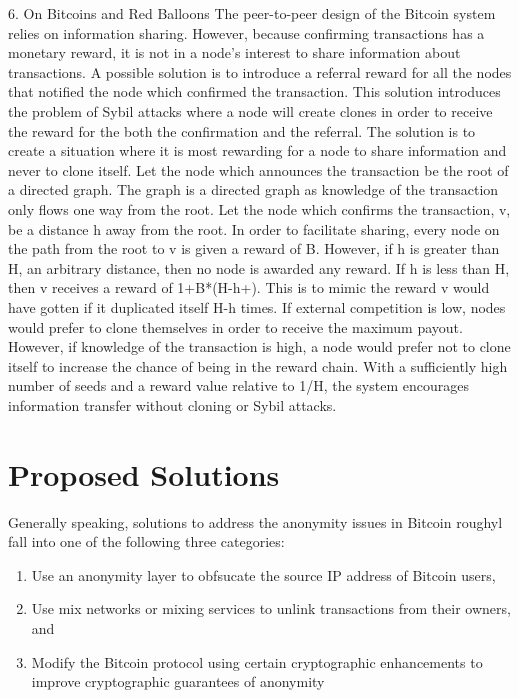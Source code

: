 6.  On Bitcoins and Red Balloons
The peer-to-peer design of the Bitcoin system relies on information sharing.  However, because confirming transactions has a monetary reward, it is not in a node’s interest to share information about transactions.  A possible solution is to introduce a referral reward for all the nodes that notified the node which confirmed the transaction.  This solution introduces the problem of Sybil attacks where a node will create clones in order to receive the reward for the both the confirmation and the referral.  The solution is to create a situation where it is most rewarding for a node to share information and never to clone itself.  Let the node which announces the transaction be the root of a directed graph.  The graph is a directed graph as knowledge of the transaction only flows one way from the root.  Let the node which confirms the transaction, v, be a distance h away from the root.  In order to facilitate sharing, every node on the path from the root to v is given a reward of B.  However, if h is greater than H, an arbitrary distance, then no node is awarded any reward.  If h is less than H, then v receives a reward of 1+B*(H-h+).  This is to mimic the reward v would have gotten if it duplicated itself H-h times.  If external competition is low, nodes would prefer to clone themselves in order to receive the maximum payout.  However, if knowledge of the transaction is high, a node would prefer not to clone itself to increase the chance of being in the reward chain.  With a sufficiently high number of seeds and a reward value relative to 1/H, the system encourages information transfer without cloning or Sybil attacks.

\section{Proposed Solutions}
Generally speaking, solutions to address the anonymity issues in Bitcoin roughyl fall into one of the following three categories:
\begin{enumerate}
	\item Use an anonymity layer to obfsucate the source IP address of Bitcoin users,
	\item Use mix networks or mixing services to unlink transactions from their owners, and
	\item Modify the Bitcoin protocol using certain cryptographic enhancements to improve cryptographic guarantees of anonymity
\end{enumerate}

